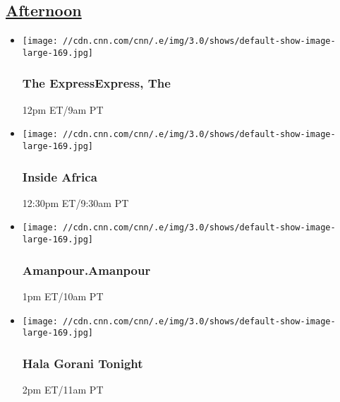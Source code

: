 \hypertarget{afternoon--6}{%
\subsection{\texorpdfstring{\href{/tv/schedule/cnn/index.html}{Afternoon}~}{Afternoon~}}\label{afternoon--6}}

\begin{itemize}
\item
  \texttt{[image: //cdn.cnn.com/cnn/.e/img/3.0/shows/default-show-image-large-169.jpg]}

  \hypertarget{the-expressexpress-the--4}{%
  \subsubsection{The ExpressExpress, The
  }\label{the-expressexpress-the--4}}

  12pm ET/9am PT
\end{itemize}

\begin{itemize}
\item
  \texttt{[image: //cdn.cnn.com/cnn/.e/img/3.0/shows/default-show-image-large-169.jpg]}

  \hypertarget{inside-africa-7}{%
  \subsubsection{Inside Africa}\label{inside-africa-7}}

  12:30pm ET/9:30am PT
\end{itemize}

\begin{itemize}
\item
  \texttt{[image: //cdn.cnn.com/cnn/.e/img/3.0/shows/default-show-image-large-169.jpg]}

  \hypertarget{amanpouramanpour--12}{%
  \subsubsection{Amanpour.Amanpour }\label{amanpouramanpour--12}}

  1pm ET/10am PT
\end{itemize}

\begin{itemize}
\item
  \texttt{[image: //cdn.cnn.com/cnn/.e/img/3.0/shows/default-show-image-large-169.jpg]}

  \hypertarget{hala-gorani-tonight-4}{%
  \subsubsection{Hala Gorani Tonight}\label{hala-gorani-tonight-4}}

  2pm ET/11am PT
\end{itemize}

